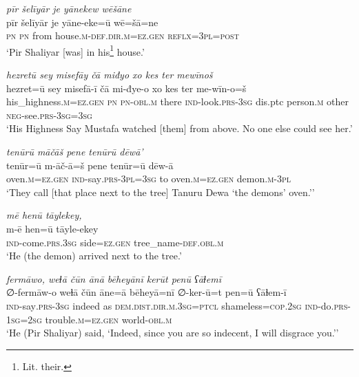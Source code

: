 \ea \label{ŽP.188}
\textit{pīr šelīyār je yānekew wēšāne} \\ 
\gll pīr šelīyār je yāne-eke=ū wē=šā=ne \\ 
 \textsc{pn} \textsc{pn} from house\textsc{.m}\textsc{-def}\textsc{.dir}\textsc{.m}\textsc{\textsc{=ez.gen}} \textsc{reflx}\textsc{=3pl}\textsc{=\textsc{post}} \\ 
\glt `Pir Shaliyar [was] in his\footnote{Lit. their.} house.'
\z 
 
\ea \label{ŽP.189}
\textit{hezretū sey misefāy čā miđyo xo kes ter mewīnoš} \\ 
\gll hezret=ū sey misefā-ī čā mi-đye-o xo kes ter me-wīn-o=š \\ 
 his\_highness\textsc{.m}\textsc{\textsc{=ez.gen}} \textsc{pn} \textsc{pn}\textsc{-obl}\textsc{.m} there \textsc{ind-}look\textsc{.prs}\textsc{-3sg} dis.ptc person\textsc{.m} other \textsc{neg-}see\textsc{.prs}\textsc{-3sg}\textsc{=3sg} \\ 
\glt `His Highness Say Mustafa watched [them] from above. No one else could see her.'
\z 
 
\ea \label{ŽP.196}
\textit{tenūrū māčāš pene tenūrū dēwā’} \\ 
\gll tenūr=ū m-āč-ā=š pene tenūr=ū dēw-ā \\ 
 oven\textsc{.m}\textsc{\textsc{=ez.gen}} \textsc{ind-}say\textsc{.prs}\textsc{-3pl}\textsc{=3sg} to oven\textsc{.m}\textsc{\textsc{=ez.gen}} demon\textsc{.m}\textsc{-3pl} \\ 
\glt `They call [that place next to the tree] Tanuru Dewa ‘the demons’ oven.’'
\z 
 
\ea \label{ŽP.197}
\textit{mē henū tāylekey,} \\ 
\gll m-ē hen=ū tāyle-ekey \\ 
 \textsc{ind-}come\textsc{.prs}\textsc{.3sg} side\textsc{\textsc{=ez.gen}} tree\_name\textsc{-def}\textsc{.obl}\textsc{.m} \\ 
\glt `He (the demon) arrived next to the tree.'
\z 
 
\ea \label{ŽP.198}
\textit{fermāwo, weɫā čūn ānā bēheyānī kerūt penū ʕāɫemī} \\ 
\gll ∅-fermāw-o weɫā čūn āne=ā bēheyā=nī ∅-ker-ū=t pen=ū ʕāɫem-ī \\ 
 \textsc{ind-}say\textsc{.prs}\textsc{-3sg} indeed as \textsc{dem.dist}\textsc{.dir}\textsc{.m}\textsc{.3sg}=\textsc{ptcl} shameless\textsc{=cop}\textsc{.\textsc{2sg}} \textsc{ind-}do\textsc{.prs}\textsc{-\textsc{1sg}}\textsc{=\textsc{2sg}} trouble\textsc{.m}\textsc{\textsc{=ez.gen}} world\textsc{-obl}\textsc{.m} \\ 
\glt `He (Pir Shaliyar) said, ‘Indeed, since you are so indecent, I will disgrace you.’'
\z 
 
